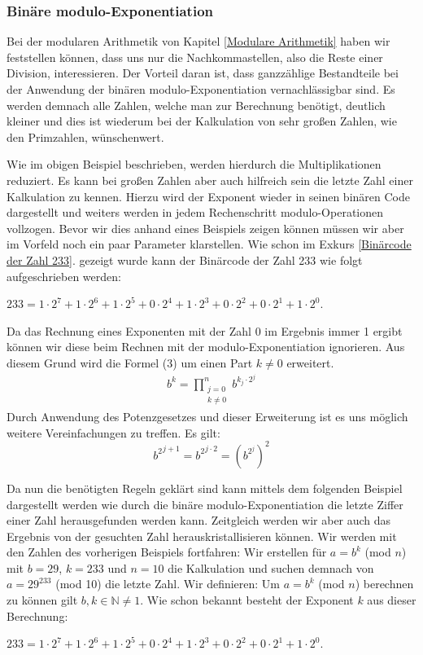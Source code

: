 \documentclass[12pt,a4paper]{article}
\theoremstyle{definition}
\begin{document}
\subsubsection{Binäre modulo-Exponentiation}\label{Binäre modulo-Exponentiation}
Bei der modularen Arithmetik von Kapitel \ref{Modulare Arithmetik} haben wir feststellen können, dass uns nur die Nachkommastellen, also die Reste einer Division, interessieren.
Der Vorteil daran ist, dass ganzzählige Bestandteile bei der Anwendung der binären modulo-Exponentiation vernachlässigbar sind.
Es werden demnach alle Zahlen, welche man zur Berechnung benötigt, deutlich kleiner und dies ist wiederum bei der Kalkulation von sehr großen Zahlen, wie den Primzahlen, wünschenwert.

Wie im obigen Beispiel beschrieben, werden hierdurch die Multiplikationen reduziert.
Es kann bei großen Zahlen aber auch hilfreich sein die letzte Zahl einer Kalkulation zu kennen.
Hierzu wird der Exponent wieder in seinen binären Code dargestellt und weiters werden in jedem Rechenschritt modulo-Operationen vollzogen.\newline
Bevor wir dies anhand eines Beispiels zeigen können müssen wir aber im Vorfeld noch ein paar Parameter klarstellen. Wie schon im Exkurs \ref{Binärcode der Zahl 233}. gezeigt wurde kann der Binärcode der Zahl 233 wie folgt aufgeschrieben werden:
\begin{center}
$233 = 1 \cdot 2^7 + 1 \cdot 2^6 + 1 \cdot2^5 + 0 \cdot2^4 + 1 \cdot 2^3 + 0 \cdot2^2 + 0 \cdot 2^1 + 1 \cdot 2^0$.
\end{center}
Da das Rechnung eines Exponenten mit der Zahl 0 im Ergebnis immer 1 ergibt können wir diese beim Rechnen mit der modulo-Exponentiation ignorieren. Aus diesem Grund wird die Formel (3) um einen Part $k \neq 0$ erweitert.
\begin{align}
b^k = \prod_{\substack{j=0\\k\neq0}}^n b^{k_j \cdot 2^j}
\end{align}
Durch Anwendung des Potenzgesetzes und dieser Erweiterung ist es uns möglich weitere Vereinfachungen zu treffen. Es gilt:
\[{b^2}^{j+1} = {b^2}^{j \cdot 2} = (b^{2^j})^2\]


Da nun die benötigten Regeln geklärt sind kann mittels dem folgenden Beispiel dargestellt werden wie durch die binäre modulo-Exponentiation die letzte Ziffer einer Zahl herausgefunden werden kann. Zeitgleich werden wir aber auch das Ergebnis von der gesuchten Zahl herauskristallisieren können.
Wir werden mit den Zahlen des vorherigen Beispiels fortfahren:
\newline
Wir erstellen für $a = b^k$ (mod $n$) mit $b = 29$, $k = 233$ und $n = 10$ die Kalkulation und suchen demnach von $a = 29^{233}$ (mod 10) die letzte Zahl.\newline
Wir definieren: Um $a = b^k$ (mod $n$) berechnen zu können gilt $b, k \in \mathbb{N} \neq 1$.
Wie schon bekannt besteht der Exponent $k$ aus dieser Berechnung:
\begin{center}
$233 = 1 \cdot 2^7 + 1 \cdot 2^6 + 1 \cdot2^5 + 0 \cdot2^4 + 1 \cdot 2^3 + 0 \cdot2^2 + 0 \cdot 2^1 + 1 \cdot 2^0$.
\end{center}
\end{document}
